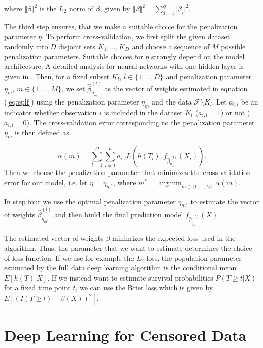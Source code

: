 \documentclass[12pt, a4paper]{article}
\theoremstyle{definition}
\theoremstyle{plain}
\numberwithin{equation}{section}
\numberwithin{figure}{section}
\numberwithin{table}{section}
\DeclareMathOperator*{\argmin}{arg\,min}
\begin{document}
	where $\Vert \beta \Vert ^2$ is the $L_2$ norm of $\beta$, given by $\Vert \beta \Vert ^2 = \sum_{i=1}^q \vert \beta _i \vert ^2.$
	
	The third step ensures, that we make a suitable choice for the penalization parameter $\eta$.
	To perform cross-validation, we first split the given dataset randomly into $D$ disjoint sets $K_1,\dots, K_D$ and choose a sequence of $M$ possible penalization parameters.
	Suitable choices for $\eta$ strongly depend on the model architecture.
	A detailed analysis for neural networks with one hidden layer is given in \citet*{regpar}. 
	Then, for a fixed subset $K_l$, $l \in \{1,\dots,D\}$ and penalization parameter $\eta_m$, $m \in \{1,\dots,M\}$, we set $\hat{\beta}_{\eta_{m}}^{(l)}$ as the vector of weights estimated in equation (\ref{eq:eplf}) using the penalization parameter $\eta_m$ and the data $\mathcal{F} \setminus K_l$.
	Let $a_{i,l}$ be an indicator whether observation $i$ is included in the dataset $K_l$ ($a_{i,l} = 1$) or not ($a_{i,l}=0$).
	The cross-validation error corresponding to the penalization parameter $\eta_m$ is then defined as
	
	\begin{equation*}
	 \alpha(m) = \sum_{l=1}^D \sum_{i=1}^n a_{i,l} L(h(T_i), f_{\hat{\beta}_{\eta_m}^{(l)}}(X_i)).
 	\end{equation*}
 	Then we choose the penalization parameter that minimizes the cross-validation error for our model, i.e. let $\eta = \eta_{m^*}$, where $m^* = \argmin_{m \in \{1,\dots,M\}} \alpha(m)$.
 	
 	In step four we use the optimal penalization parameter $\eta_{m^*}$ to estimate the vector of weights $\hat{\beta}_{\eta_{m^*}}^{(l)}$ and then build the final prediction model $f_{\hat{\beta}_{\eta_{m^*}}^{(l)}}(X)$.
 	
 	The estimated vector of weights $\beta$ minimizes the expected loss used in the algorithm.
 	Thus, the parameter that we want to estimate determines the choice of loss function.
 	If we use for example the $L_2$ loss, the population parameter estimated by the full data deep learning algorithm is the conditional mean $E[h(T) \vert X]$.
 	If we instead want to estimate survival probabilities $P(T\geq t \vert X )$ for a fixed time point $t$, we can use the Brier loss which is given by $E[(I(T\geq t)-\beta(X))^2]$.
 	
	\newpage
	\section{Deep Learning for Censored Data} \label{censored}
	
\end{document}
